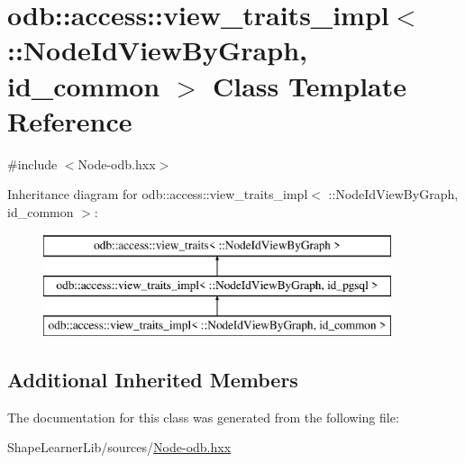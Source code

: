 \hypertarget{classodb_1_1access_1_1view__traits__impl_3_01_1_1_node_id_view_by_graph_00_01id__common_01_4}{}\section{odb\+:\+:access\+:\+:view\+\_\+traits\+\_\+impl$<$ \+:\+:Node\+Id\+View\+By\+Graph, id\+\_\+common $>$ Class Template Reference}
\label{classodb_1_1access_1_1view__traits__impl_3_01_1_1_node_id_view_by_graph_00_01id__common_01_4}


{\ttfamily \#include $<$Node-\/odb.\+hxx$>$}

Inheritance diagram for odb\+:\+:access\+:\+:view\+\_\+traits\+\_\+impl$<$ \+:\+:Node\+Id\+View\+By\+Graph, id\+\_\+common $>$\+:\begin{figure}[H]
\begin{center}
\leavevmode
\includegraphics[height=3.000000cm]{d3/dfa/classodb_1_1access_1_1view__traits__impl_3_01_1_1_node_id_view_by_graph_00_01id__common_01_4}
\end{center}
\end{figure}
\subsection*{Additional Inherited Members}


The documentation for this class was generated from the following file\+:\begin{DoxyCompactItemize}
\item 
Shape\+Learner\+Lib/sources/\hyperlink{_node-odb_8hxx}{Node-\/odb.\+hxx}\end{DoxyCompactItemize}
